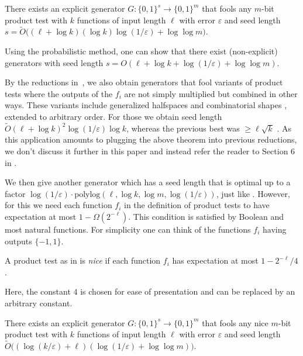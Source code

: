 \documentclass{toc}
\newcommand{\zo}{\{0,1\}}
\def\eps{\varepsilon}
\def\pmone{\{-1, 1\}}
\def\Blocklength{\ell}
\def\polylog{\mathrm{polylog}}
\begin{document}
\begin{theorem} \label{t-prg-prod-C1}
  There exists an explicit generator $G\colon \zo^s \to \zo^m$ that fools any
 $m$-bit  %
  product test with $k$ functions of input length $\Blocklength$ with
  error $\eps$ and seed length $s = \tilde O \bigl( (\ell + \log k) (\log k) \log(1/\eps) + \log\log m \bigr)$.
\end{theorem}
%
Using the probabilistic method, one can show that there exist (non-explicit) generators with seed length $s = O(\ell + \log k + \log(1/\eps) + \log\log m)$.  %
%

By the reductions in~\cite{GopalanKM18}, we also obtain generators that
fool variants of product tests where the outputs of the $f_i$ are not simply
multiplied but combined in other ways.  These variants include generalized
halfspaces \cite{GopalanOWZ10} and combinatorial shapes
\cite{GopalanMRZ13,De15}, extended to arbitrary order.  For those we
obtain seed length $\tilde O(\Blocklength + \log k)^2 \log(1/\eps) \log k$, whereas the previous best was
$\ge \Blocklength \sqrt k$ \cite{HaramatyLV-bipnfp}. As this application amounts to plugging
the above theorem %
into  %
previous reductions, we don't discuss it further in this
paper and instead refer the reader to Section 6 in \cite{HaramatyLV-bipnfp}.

\medskip

We then give another generator which has a seed length that is
optimal up to a factor
%
%
%
$\log(1/\eps) \cdot \polylog(\ell, \log k, \log m, \log(1/\eps))$, 
just like .
However, for this we need each function $f_i$ in the definition of product 
tests to have expectation at most $1 - \Omega(2^{-\Blocklength})$.
This condition is satisfied by Boolean and most natural functions.
For simplicity one can think of the functions $f_i$ having outputs $\pmone$.

\begin{definition}
A product test as in  is \emph{nice} if each
function $f_i$ has expectation at most $1 - 2^{-\Blocklength} / 4$.
\end{definition}

Here, the constant $4$ is chosen for ease of presentation and can
be replaced by %
an  %
arbitrary constant.

\begin{theorem} \label{t-prg-prod-nice}
There exists an explicit generator $G\colon \zo^s \to \zo^m$ that fools
any nice
$m$-bit  %
product test with $k$ functions of input length $\Blocklength$ 
with error $\eps$ and seed length 
$\tilde O \bigl((\log(k/\eps) + \Blocklength)(\log(1/\eps)+\log\log m)\bigr)$.
\end{theorem}
\end{document}
